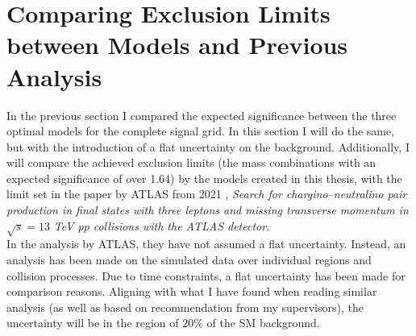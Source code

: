 \section{Comparing Exclusion Limits between Models and Previous Analysis}
In the previous section I compared the expected significance between 
the three optimal models for the complete signal grid. In this section 
I will do the same, but with the introduction of a flat uncertainty on the background.
Additionally, I will compare the achieved exclusion limits (the mass combinations with an expected 
significance of over 1.64) by the models created in this thesis, with the limit set in the paper by \ac{ATLAS} 
from 2021 \cite{atlas_search_2021}, \emph{Search for chargino--neutralino pair production in final states with 
three leptons and missing transverse momentum in} $\sqrt{s}=13$ \emph{TeV pp collisions with the ATLAS detector}.
\\
In the analysis by \ac{ATLAS}, they have not assumed a flat uncertainty. Instead, an analysis has been made on the simulated data 
over individual regions and collision processes. Due to time constraints, a flat uncertainty has been made for comparison 
reasons. Aligning with what I have found when reading similar analysis (as well as based on recommendation from my supervisors), 
the uncertainty will be in the region of $20\%$ of the \ac{SM} background.\\
